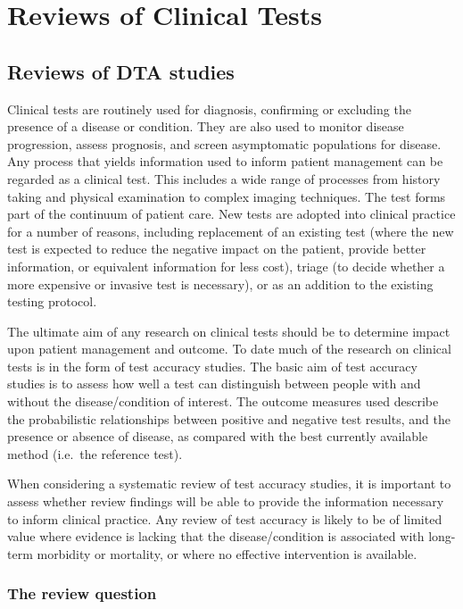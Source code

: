 \documentclass[
  10pt,
  a4paper,
  DIV=11,
  numbers=noendperiod]{scrreprt}
\begin{document}
\part{Reviews of Clinical Tests}

\chapter{Reviews of DTA studies}\label{reviews-of-dta-studies}

Clinical tests are routinely used for diagnosis, confirming or excluding
the presence of a disease or condition. They are also used to monitor
disease progression, assess prognosis, and screen asymptomatic
populations for disease. Any process that yields information used to
inform patient management can be regarded as a clinical test. This
includes a wide range of processes from history taking and physical
examination to complex imaging techniques. The test forms part of the
continuum of patient care. New tests are adopted into clinical practice
for a number of reasons, including replacement of an existing test
(where the new test is expected to reduce the negative impact on the
patient, provide better information, or equivalent information for less
cost), triage (to decide whether a more expensive or invasive test is
necessary), or as an addition to the existing testing protocol.

The ultimate aim of any research on clinical tests should be to
determine impact upon patient management and outcome. To date much of
the research on clinical tests is in the form of test accuracy studies.
The basic aim of test accuracy studies is to assess how well a test can
distinguish between people with and without the disease/condition of
interest. The outcome measures used describe the probabilistic
relationships between positive and negative test results, and the
presence or absence of disease, as compared with the best currently
available method (i.e.~the reference test).

When considering a systematic review of test accuracy studies, it is
important to assess whether review findings will be able to provide the
information necessary to inform clinical practice. Any review of test
accuracy is likely to be of limited value where evidence is lacking that
the disease/condition is associated with long-term morbidity or
mortality, or where no effective intervention is available.

\section{The review question}\label{the-review-question}
\end{document}
